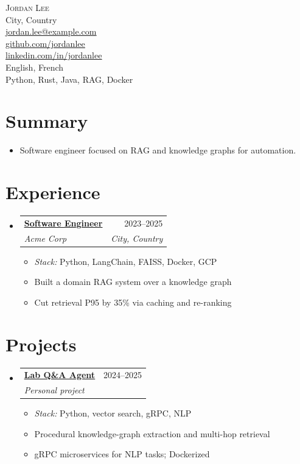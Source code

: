 \documentclass[letterpaper,11pt]{article}
\makeatletter
\newcommand{\resumeItem}[1]{
  \item\small{
    {#1 \vspace{-2pt}}
  }
}
\newcommand{\resumeSubheading}[4]{
  \vspace{-2pt}\item
    \begin{tabular*}{0.97\linewidth}[t]{l@{\extracolsep{\fill}}r}
      \textbf{#1} & #2 \\
      \textit{\small#3} & \textit{\small #4} \\
    \end{tabular*}\vspace{-7pt}
}
\newcommand{\resumeSubHeadingListStart}{\begin{itemize}[leftmargin=0.15in, label={}]}
\newcommand{\resumeSubHeadingListEnd}{\end{itemize}}
\newcommand{\resumeItemListStart}{\begin{itemize}}
\newcommand{\resumeItemListEnd}{\end{itemize}\vspace{-5pt}}
\makeatother
\begin{document}
\noindent
\begin{minipage}[t]{0.30\textwidth}
\raggedright
{\Huge \scshape Jordan Lee}\\[8pt]
\small
City, Country\\[4pt]
\href{mailto:jordan.lee@example.com}{\underline{jordan.lee@example.com}}\\[4pt]
\href{https://github.com/jordanlee}{\underline{github.com/jordanlee}}\\[4pt]
\href{https://linkedin.com/in/jordanlee}{\underline{linkedin.com/in/jordanlee}}\\[4pt]
English, French\\[4pt]
Python, Rust, Java, RAG, Docker
\end{minipage}%
\hfill
\begin{minipage}[t]{0.66\textwidth}
\section{Summary}
\resumeItemListStart
  \resumeItem{Software engineer focused on RAG and knowledge graphs for automation.}
\resumeItemListEnd

\section{Experience}
  \resumeSubHeadingListStart
    \resumeSubheading
      {\href{https://example.com}{\underline{Software Engineer}}}{2023–2025}
      {Acme Corp}{City, Country}
      \resumeItemListStart
        \resumeItem{\textit{Stack:} Python, LangChain, FAISS, Docker, GCP}
        \resumeItem{Built a domain RAG system over a knowledge graph}
        \resumeItem{Cut retrieval P95 by 35\% via caching and re-ranking}
      \resumeItemListEnd
  \resumeSubHeadingListEnd

\section{Projects}
  \resumeSubHeadingListStart
    \resumeSubheading
      {\href{https://github.com/jordanlee/labmate}{\underline{Lab Q\&A Agent}}}{2024–2025}
      {Personal project}{}
      \resumeItemListStart
        \resumeItem{\textit{Stack:} Python, vector search, gRPC, NLP}
        \resumeItem{Procedural knowledge-graph extraction and multi-hop retrieval}
        \resumeItem{gRPC microservices for NLP tasks; Dockerized}
      \resumeItemListEnd
  \resumeSubHeadingListEnd

\end{minipage}
\end{document}
